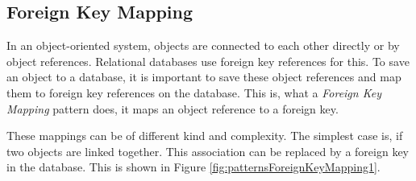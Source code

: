 		\subsection{Foreign Key Mapping}
		\label{subsec:foreignKeyMapping}
			In an object-oriented system, objects are connected to each other directly or by object
			references. Relational databases use foreign key references for this. To save an object
			to a database, it is important to save these object references and map them to foreign 
			key references on the database. This is, what a \textit{Foreign Key Mapping} pattern does, it maps
			an object reference to a foreign key.

			These mappings can be of different kind and complexity. The simplest case is, if two
			objects are linked together. This association can be replaced
			by a foreign key in the database. This is shown in Figure \ref{fig:patternsForeignKeyMapping1}.

